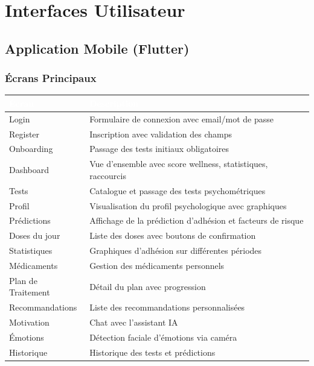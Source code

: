 \documentclass[12pt,a4paper]{report}
\begin{document}
\newpage

\chapter{Interfaces Utilisateur}

\section{Application Mobile (Flutter)}

\subsection{Écrans Principaux}

\begin{longtable}{|l|p{8cm}|}
    \hline
    \rowcolor{emsiblue}\textcolor{white}{\textbf{Écran}} & \textcolor{white}{\textbf{Description}} \\
    \hline
    
    Login & Formulaire de connexion avec email/mot de passe \\
    \hline
    Register & Inscription avec validation des champs \\
    \hline
    Onboarding & Passage des tests initiaux obligatoires \\
    \hline
    Dashboard & Vue d'ensemble avec score wellness, statistiques, raccourcis \\
    \hline
    Tests & Catalogue et passage des tests psychométriques \\
    \hline
    Profil & Visualisation du profil psychologique avec graphiques \\
    \hline
    Prédictions & Affichage de la prédiction d'adhésion et facteurs de risque \\
    \hline
    Doses du jour & Liste des doses avec boutons de confirmation \\
    \hline
    Statistiques & Graphiques d'adhésion sur différentes périodes \\
    \hline
    Médicaments & Gestion des médicaments personnels \\
    \hline
    Plan de Traitement & Détail du plan avec progression \\
    \hline
    Recommandations & Liste des recommandations personnalisées \\
    \hline
    Motivation & Chat avec l'assistant IA \\
    \hline
    Émotions & Détection faciale d'émotions via caméra \\
    \hline
    Historique & Historique des tests et prédictions \\
    \hline
\end{longtable}
\end{document}
